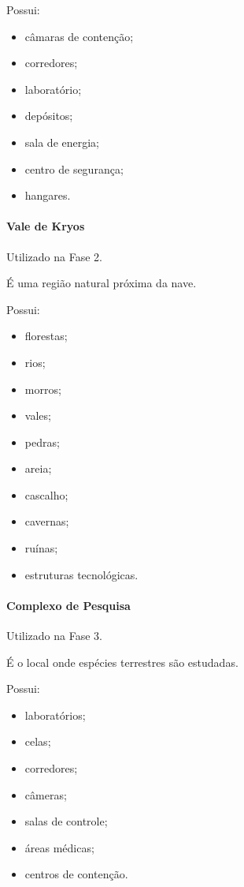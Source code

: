 \documentclass[12pt,a4paper]{article}
\begin{document}
Possui:

\begin{itemize}
    \item câmaras de contenção;
    \item corredores;
    \item laboratório;
    \item depósitos;
    \item sala de energia;
    \item centro de segurança;
    \item hangares.
\end{itemize}

\paragraph{Vale de Kryos}

Utilizado na Fase 2.

É uma região natural próxima da nave.

Possui:

\begin{itemize}
    \item florestas;
    \item rios;
    \item morros;
    \item vales;
    \item pedras;
    \item areia;
    \item cascalho;
    \item cavernas;
    \item ruínas;
    \item estruturas tecnológicas.
\end{itemize}

\paragraph{Complexo de Pesquisa}

Utilizado na Fase 3.

É o local onde espécies terrestres são estudadas.

Possui:

\begin{itemize}
    \item laboratórios;
    \item celas;
    \item corredores;
    \item câmeras;
    \item salas de controle;
    \item áreas médicas;
    \item centros de contenção.
\end{itemize}
\end{document}
